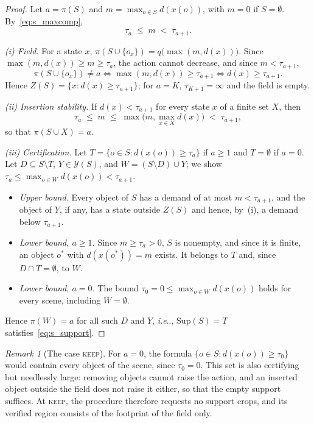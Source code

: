 \documentclass[10pt,letterpaper]{article}
\makeatletter
\DeclareRobustCommand\onedot{\futurelet\@let@token\@onedot}
\def\@onedot{\ifx\@let@token.\else.\null\fi\xspace}
\def\ie{\emph{i.e}\onedot} \def\Ie{\emph{I.e}\onedot}
\newcommand{\Sup}{\mathrm{Sup}}
\newcommand{\field}{Z}
\newcommand{\policy}{\pi}
\newcommand{\dem}{d}
\theoremstyle{remark}
\newtheorem{remark}{Remark}
\theoremstyle{plain}
\theoremstyle{definition}
\makeatother
\begin{document}
\begin{proof}
Let $a=\policy(S)$ and $m=\max_{o\in S}\dem(x(o))$, with $m=0$ if $S=\emptyset$.
By~\cref{eq:s_maxcomp},
\begin{equation}
\tau_a\;\le\; m\;<\;\tau_{a+1}.
\label{eq:s_bracket}
\end{equation}

\emph{(i) Field.}
For a state $x$, $\policy(S\cup\{o_x\})=q\big(\max(m,\dem(x))\big)$.
Since $\max(m,\dem(x))\ge m\ge\tau_a$, the action cannot decrease, and since $m<\tau_{a+1}$,
\begin{equation}
\policy(S\cup\{o_x\})\neq a\iff\max(m,\dem(x))\ge\tau_{a+1}\iff\dem(x)\ge\tau_{a+1}.
\end{equation}
Hence $\field(S)=\{x:\dem(x)\ge\tau_{a+1}\}$; for $a=K$, $\tau_{K+1}=\infty$ and the field is empty.

\emph{(ii) Insertion stability.}
If $\dem(x)<\tau_{a+1}$ for every state $x$ of a finite set $X$, then
\begin{equation}
\tau_a\;\le\; m\;\le\;\max\Big(m,\max_{x\in X}\dem(x)\Big)\;<\;\tau_{a+1},
\end{equation}
so that $\policy(S\cup X)=a$.

\emph{(iii) Certification.}
Let $T=\{o\in S:\dem(x(o))\ge\tau_a\}$ if $a\ge1$ and $T=\emptyset$ if $a=0$.
Let $D\subseteq S\setminus T$, $Y\in\mathcal{Y}(S)$, and $W=(S\setminus D)\cup Y$; we show $\tau_a\le\max_{o\in W}\dem(x(o))<\tau_{a+1}$.
\begin{itemize}
\item \emph{Upper bound.} Every object of $S$ has a demand of at most $m<\tau_{a+1}$, and the object of $Y$, if any, has a state outside $\field(S)$ and hence, by~(i), a demand below $\tau_{a+1}$.
\item \emph{Lower bound, $a\ge1$.} Since $m\ge\tau_a>0$, $S$ is nonempty, and since it is finite, an object $o^\ast$ with $\dem(x(o^\ast))=m$ exists. It belongs to $T$ and, since $D\cap T=\emptyset$, to $W$.
\item \emph{Lower bound, $a=0$.} The bound $\tau_0=0\le\max_{o\in W}\dem(x(o))$ holds for every scene, including $W=\emptyset$.
\end{itemize}
Hence $\policy(W)=a$ for all such $D$ and $Y$, \ie, $\Sup(S)=T$ satisfies~\cref{eq:s_support}.
\end{proof}

\begin{remark}[The case \textsc{keep}]
For $a=0$, the formula $\{o\in S:\dem(x(o))\ge\tau_0\}$ would contain every object of the scene, since $\tau_0=0$.
This set is also certifying but needlessly large: removing objects cannot raise the action, and an inserted object outside the field does not raise it either, so that the empty support suffices.
At \textsc{keep}, the procedure therefore requests no support crops, and its verified region consists of the footprint of the field only.
\end{remark}
\end{document}

